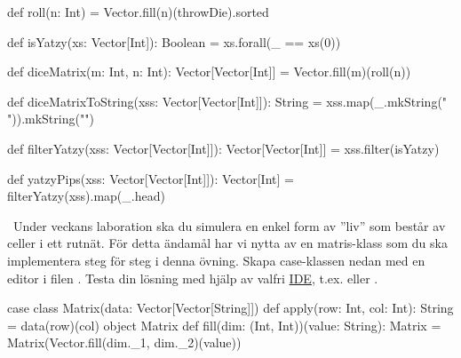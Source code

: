 \SubtaskSolved  \begin{Code}
def roll(n: Int) = Vector.fill(n)(throwDie).sorted
\end{Code}

\SubtaskSolved  \begin{Code}
def isYatzy(xs: Vector[Int]): Boolean = xs.forall(_ == xs(0))
\end{Code}



\SubtaskSolved  \begin{Code}
def diceMatrix(m: Int, n: Int): Vector[Vector[Int]] =
  Vector.fill(m)(roll(n))
\end{Code}

\SubtaskSolved  \begin{Code}
def diceMatrixToString(xss: Vector[Vector[Int]]): String =
  xss.map(_.mkString(" ")).mkString("\n")
\end{Code}


\SubtaskSolved
\begin{Code}
def filterYatzy(xss: Vector[Vector[Int]]): Vector[Vector[Int]] =
  xss.filter(isYatzy)
\end{Code}



\SubtaskSolved  \begin{Code}
def yatzyPips(xss: Vector[Vector[Int]]): Vector[Int] =
  filterYatzy(xss).map(_.head)
\end{Code}

\QUESTEND









\QUESTBEGIN

\Task\label{exe:matrices:labprep}  \what~Under veckans laboration ska du simulera en enkel form av ''liv'' som består av celler i ett rutnät. För detta ändamål har vi nytta av en matris-klass som du ska implementera steg för steg i denna övning.
Skapa case-klassen nedan med en editor i filen . Testa din lösning med hjälp av valfri \hyperref[appendix:ide]{IDE}, t.ex.  eller .
\begin{Code}
case class Matrix(data: Vector[Vector[String]]){
  def apply(row: Int, col: Int): String = data(row)(col)
}
object Matrix {
  def fill(dim: (Int, Int))(value: String): Matrix =
    Matrix(Vector.fill(dim._1, dim._2)(value))
}
\end{Code}

